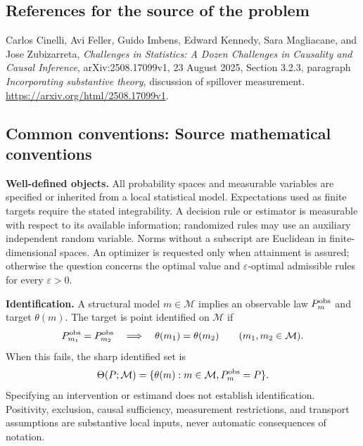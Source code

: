 \documentclass[11pt,a4paper]{article}
\begin{document}
\subsection*{References for the source of the problem}
Carlos Cinelli, Avi Feller, Guido Imbens, Edward Kennedy, Sara Magliacane, and Jose Zubizarreta, \emph{Challenges in Statistics: A Dozen Challenges in Causality and Causal Inference}, arXiv:2508.17099v1, 23 August 2025, Section 3.2.3, paragraph \emph{Incorporating substantive theory}, discussion of spillover measurement. \url{https://arxiv.org/html/2508.17099v1}.

\subsection*{Common conventions: Source mathematical conventions}

\textbf{Well-defined objects.}
All probability spaces and measurable variables are specified or inherited
from a local statistical model. Expectations used as finite targets require
the stated integrability. A decision rule or estimator is measurable with
respect to its available information; randomized rules may use an auxiliary
independent random variable. Norms without a subscript are Euclidean in
finite-dimensional spaces. An optimizer is requested only when attainment
is assured; otherwise the question concerns the optimal value and
$\varepsilon$-optimal admissible rules for every $\varepsilon>0$.

\textbf{Identification.}
A structural model $m\in\mathcal M$ implies an observable law
$P_m^{\rm obs}$ and target $\theta(m)$. The target is point identified on
$\mathcal M$ if
\[
 P_{m_1}^{\rm obs}=P_{m_2}^{\rm obs}
 \quad\Longrightarrow\quad\theta(m_1)=\theta(m_2)
 \qquad(m_1,m_2\in\mathcal M).
\]
When this fails, the sharp identified set is
\[
 \Theta(P;\mathcal M)=\{\theta(m):m\in\mathcal M,
                                  P_m^{\rm obs}=P\}.
\]
Specifying an intervention or estimand does not establish identification.
Positivity, exclusion, causal sufficiency, measurement restrictions, and
transport assumptions are substantive local inputs, never automatic
consequences of notation.
\end{document}
